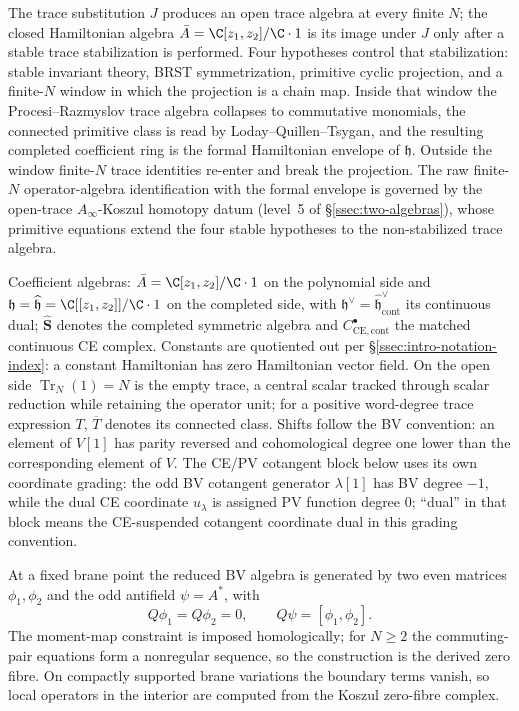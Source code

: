 \documentclass[11pt]{memoir}
\begin{document}
The trace substitution \(J\) produces an open trace algebra at every
finite \(N\); the closed Hamiltonian algebra
\(\bar A=\C[z_1,z_2]/\C\cdot1\) is its image under \(J\) only after a
stable trace stabilization is performed.  Four
hypotheses control that stabilization: stable invariant theory, BRST
symmetrization, primitive cyclic projection, and a finite-\(N\)
window in which the projection is a chain map.  Inside that window the
Procesi--Razmyslov trace algebra collapses to commutative monomials,
the connected primitive class is read by Loday--Quillen--Tsygan, and
the resulting completed coefficient ring is the formal Hamiltonian
envelope of \(\mathfrak h\).  Outside the window finite-\(N\) trace
identities re-enter and break the projection.  The raw finite-\(N\)
operator-algebra identification with the formal envelope is governed by
the open-trace \(A_\infty\)-Koszul homotopy datum
(level~5 of \S\ref{ssec:two-algebras}), whose primitive equations
extend the four stable hypotheses to the non-stabilized trace algebra.

Coefficient algebras: \(\bar A=\C[z_1,z_2]/\C\cdot1\) on the
polynomial side and
\(\mathfrak h=\widehat{\mathfrak h}=\C[[z_1,z_2]]/\C\cdot1\) on the
completed side, with \(\mathfrak h^\vee
=\widehat{\mathfrak h}^\vee_{\mathrm{cont}}\) its continuous dual;
\(\widehat{\mathbf S}\) denotes the completed symmetric algebra and
\(C^\bullet_{\mathrm{CE},\mathrm{cont}}\) the matched continuous CE
complex.  Constants are quotiented out per
\S\ref{ssec:intro-notation-index}: a constant Hamiltonian has zero
Hamiltonian vector field.  On the open side \(\operatorname{Tr}_N(1)=N\)
is the empty trace, a central scalar tracked through scalar reduction
while retaining the operator unit; for a positive word-degree
trace expression \(T\), \(\overline T\) denotes its connected class.
Shifts follow the BV convention: an element of \(V[1]\) has parity
reversed and cohomological degree one lower than the corresponding
element of \(V\).  The CE/PV cotangent block below uses its own
coordinate grading: the odd BV cotangent generator \(\lambda[1]\) has
BV degree \(-1\), while the dual CE coordinate \(u_\lambda\) is
assigned PV function degree \(0\); ``dual'' in that block means the
CE-suspended cotangent coordinate dual in this grading convention.

At a fixed brane point the reduced BV algebra is generated by two even
matrices \(\phi_1,\phi_2\) and the odd antifield \(\psi=A^*\), with
\[
  Q\phi_1=Q\phi_2=0,\qquad Q\psi=[\phi_1,\phi_2].
\]
The moment-map constraint is imposed homologically; for \(N\ge 2\) the
commuting-pair equations form a nonregular sequence, so the construction
is the derived zero fibre.
On compactly supported brane variations the boundary terms vanish, so
local operators in the interior are computed from the Koszul zero-fibre
complex.
\end{document}
